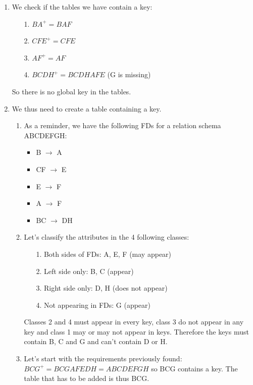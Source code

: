 \documentclass[11pt]{article}
\begin{document}
\begin{enumerate}
\begin{enumerate}
\begin{enumerate}
            \item We check if the tables we have contain a key:
            \begin{itemize}
                \item [1.] $BA^+ = BAF$
                \item [2.] $CFE^+ = CFE$
                \item [3.] $AF^+ = AF$
                \item [4.] $BCDH^+ = BCDHAFE$ (G is missing)
            \end{itemize}
            So there is no global key in the tables.
            \item We thus need to create a table containing a key.
            \begin{enumerate}
                \item As a reminder, we have the following FDs for a relation schema ABCDEFGH:
                    \begin{itemize}
                      \item B $\rightarrow$ A
                      \item CF $\rightarrow$ E
                      \item E $\rightarrow$ F
                      \item A $\rightarrow$ F
                      \item BC $\rightarrow$ DH
                    \end{itemize}
                \item Let's classify the attributes in the 4 following classes:
                \begin{itemize}
                    \item [1.] Both sides of FDs: A, E, F (may appear)
                    \item [2.] Left side only: B, C (appear)
                    \item [3.] Right side only: D, H (does not appear)
                    \item [4.] Not appearing in FDs: G (appear)
                \end{itemize}
                Classes 2 and 4 must appear in every key, class 3 do not appear in any key and class 1 may or may not appear in keys. 
                Therefore the keys must contain B, C and G and can't contain D or H.
                \item Let's start with the requirements previously found:
                $BCG^+ = BCGAFEDH = ABCDEFGH$ so BCG contains a key. The table that has to be added is thus BCG.

\end{enumerate}
\end{enumerate}
\end{enumerate}
\end{enumerate}
\end{document}
